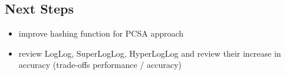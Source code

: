 \documentclass[11pt]{article}
\begin{document}
\subsection*{Next Steps}
\label{sec:orgd60047b}
\begin{itemize}
\item improve hashing function for PCSA approach
\item review LogLog, SuperLogLog, HyperLogLog and review their increase in accuracy (trade-offs performance / accuracy)
\end{itemize}
\end{document}
